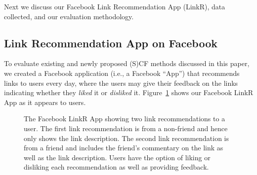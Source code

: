 Next we discuss our Facebook Link Recommendation
App (LinkR), data collected, and our evaluation methodology.

\subsection{Link Recommendation App on Facebook}

To evaluate existing and newly proposed (S)CF methods discussed in
this paper, we created a Facebook application (i.e., a Facebook
``App'') that recommends links to users every day, where the users may
give their feedback on the links indicating whether they \emph{liked}
it or \emph{disliked} it.  Figure~\ref{fig:linkr_app} shows 
our Facebook LinkR App as it appears to users.

\begin{figure}[t!]
\hspace{-2mm} 
\vspace{-5mm}
\caption{The Facebook LinkR App showing two link recommendations to a 
user.  The first link recommendation is from a non-friend and hence only
shows the link description.  
The second link recommendation is from a
friend and includes the friend's commentary on the link as well as the
link description.  
Users have the option of liking or disliking each
recommendation as well as providing feedback.}
\label{fig:linkr_app}
\vspace{-1mm}
\end{figure}

